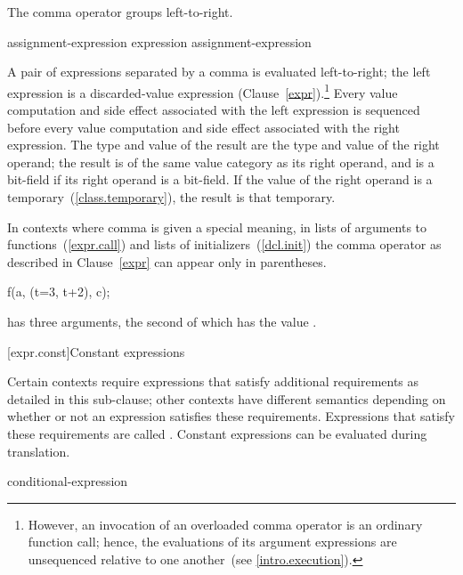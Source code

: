 \pnum
The comma operator groups left-to-right.

\begin{bnf}
\br
    assignment-expression\br
    expression \terminal{,} assignment-expression
\end{bnf}

A pair of expressions separated by a comma is evaluated left-to-right;
the left expression is
a discarded-value expression (Clause~\ref{expr}).\footnote{However, an
invocation of an overloaded comma operator is an ordinary function call; hence,
the evaluations of its argument expressions are unsequenced relative to one
another~(see \ref{intro.execution}).}
Every
%
value computation and side effect
associated with the left expression is sequenced before every value
computation and side effect associated with the right expression.
%
The type and value of the
result are the type and value of the right operand; the result is of the same
value category as its right operand, and is a bit-field if its
right operand is a bit-field.
If the value of the right operand is a temporary~(\ref{class.temporary}),
the result is that temporary.

\pnum
In contexts where comma is given a special meaning, \enterexample in
lists of arguments to functions~(\ref{expr.call}) and lists of
initializers~(\ref{dcl.init}) \exitexample the comma operator as
described in Clause~\ref{expr} can appear only in parentheses.
\enterexample 

\begin{codeblock}
f(a, (t=3, t+2), c);
\end{codeblock}

has three arguments, the second of which has the value
.
\exitexample 

[expr.const]{Constant expressions}%

\pnum
Certain contexts require expressions that satisfy additional
requirements as detailed in this sub-clause; other contexts have different
semantics depending on whether or not an expression satisfies these requirements.
Expressions that satisfy these requirements are called 
. \enternote Constant expressions can be evaluated
during translation.\exitnote

\begin{bnf}
\br
    conditional-expression
\end{bnf}

